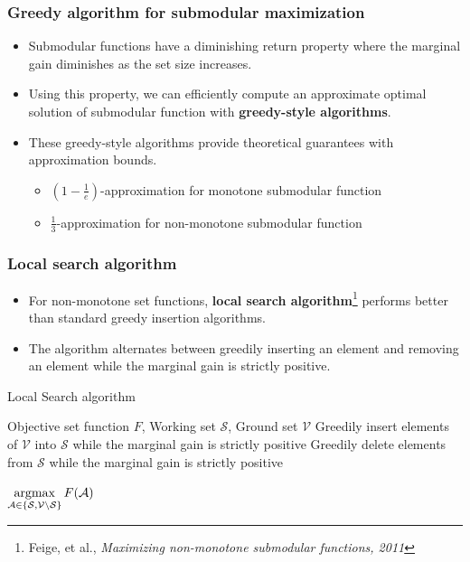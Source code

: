 \documentclass[10pt,mathserif]{beamer}
\newcommand{\algorithmicinput}{\textbf{input}}
\newcommand{\algorithmicoutput}{\textbf{output}}
\newcommand{\INPUT}{\item[\algorithmicinput]}
\newcommand{\OUTPUT}{\item[\algorithmicoutput]}
\begin{document}
\begin{frame}
\frametitle{Greedy algorithm for submodular maximization}
\begin{itemize}\itemsep=12pt
\item Submodular functions have a diminishing return property where the marginal gain diminishes as the set size increases.\pause
\item Using this property, we can efficiently compute an approximate optimal solution of submodular function with \textbf{greedy-style algorithms}.\pause
\item These greedy-style algorithms provide theoretical guarantees with approximation bounds.
\vspace{0.5em}
\begin{itemize}\itemsep=6pt
    \item $(1-\frac{1}{e})$-approximation for monotone submodular function
    \item $\frac{1}{3}$-approximation for non-monotone submodular function
\end{itemize} 
\end{itemize}
\end{frame}

\begin{frame}
\frametitle{Local search algorithm}
\begin{itemize}\itemsep=10pt
    \item For non-monotone set functions, \textbf{local search algorithm}\footnote{Feige, et al., \textit{Maximizing non-monotone submodular functions, 2011}} performs better than standard greedy insertion algorithms.\pause
    \item The algorithm alternates between greedily inserting an element and removing an element while the marginal gain is strictly positive.\pause
\end{itemize}
\setcounter{algorithm}{0}
\begin{algorithm}[H]
\footnotesize
\caption{Local Search algorithm}
\label{alg:local_search}
\begin{algorithmic}[1]
\INPUT Objective set function $F$, Working set $\mathcal{S}$, Ground set $\mathcal{V}$
\STATE Greedily insert elements of $\mathcal{V}$ into $\mathcal{S}$ while the marginal gain is strictly positive
\STATE Greedily delete elements from $\mathcal{S}$ while the marginal gain is strictly positive
\ENDFOR
\OUTPUT $\mathop{\rm argmax}\limits_{\mathcal{A} \in \{\mathcal{S}, \mathcal{V} \setminus \mathcal{S} \}} F(\mathcal{A})$
\end{algorithmic}
\end{algorithm}
\end{frame}
\end{document}
